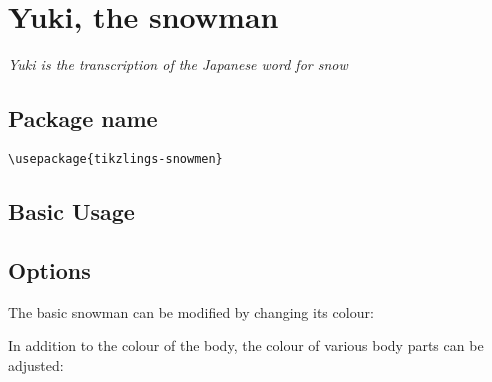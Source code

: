 \documentclass[parskip=half]{scrartcl}
\begin{document}
%
%
\clearpage
\section[Snowman]{Yuki, the snowman}

\emph{Yuki is the transcription of the Japanese word for snow}

\subsection{Package name}

\begin{tcolorbox}[lower separated=false, lefthand width=.8\linewidth]
\vspace*{0.5cm}
\lstinline|\usepackage{tikzlings-snowmen}| 
\vspace*{0.5cm}
\end{tcolorbox}

\subsection{Basic Usage}

\begin{tcblisting}{}
\snowman
\end{tcblisting}

\subsection{Options}

The basic snowman can be modified by changing its colour:
\begin{tcblisting}{}
\snowman[body=blue]
\end{tcblisting}

In addition to the colour of the body, the colour of various body parts can be adjusted:
\begin{tcblisting}{}
\snowman[eye=red]
\end{tcblisting}
\begin{tcblisting}{}
\snowman[nose=red]
\end{tcblisting}
\begin{tcblisting}{}
\snowman[mouth=red]
\end{tcblisting}
\begin{tcblisting}{}
\snowman[buttons=red]
\end{tcblisting}
\end{document}
